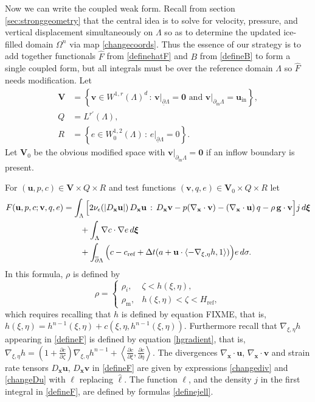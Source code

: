 \documentclass[letterpaper,final,12pt,reqno]{amsart}
\newcommand{\eps}{\epsilon}
\newcommand{\grad}{\nabla}
\newcommand{\bu}{\mathbf{u}}
\newcommand{\bv}{\mathbf{v}}
\newcommand{\bx}{\mathbf{x}}
\newcommand{\bV}{\mathbf{V}}
\newcommand{\bxi}{\bm{\xi}}
\newcommand{\bzero}{\bm{0}}
\newcommand{\cref}{c_{\text{ref}}}
\newcommand{\Href}{H_{\text{ref}}}
\newcommand{\rhom}{\rho_{\text{m}}}
\begin{document}
Now we can write the coupled weak form.  Recall from section \ref{sec:stronggeometry} that the central idea is to solve for velocity, pressure, and vertical displacement simultaneously on $\Lambda$ so as to determine the updated ice-filled domain $\Omega^n$ via map \eqref{changecoords}.  Thus the essence of our strategy is to add together functionals $\hat F$ from \eqref{definehatF} and $B$ from \eqref{defineB} to form a single coupled form, but all integrals must be over the reference domain $\Lambda$ so $\hat F$ needs modification.  Let
\begin{align*}
\bV &= \left\{\bv \in W^{1,r}(\Lambda)^d\,:\,\bv\big|_{\underline{\partial} \Lambda}=\bzero \text{ and } \bv\big|_{\partial_{\text{in}} \Lambda} = \bu_{\text{in}}\right\}, \\
Q   &= L^{r'}(\Lambda), \\
R   &= \left\{e \in W_0^{1,2}(\Lambda)\,:\,e\big|_{\underline{\partial} \Lambda} = 0\right\}.
\end{align*}
Let $\bV_0$ be the obvious modified space with $\bv\big|_{\partial_{\text{in}} \Lambda} = \bzero$ if an inflow boundary is present.

For $(\bu,p,c) \in \bV\times Q\times R$ and test functions $(\bv,q,e) \in \bV_0\times Q\times R$ let
\begin{align}
F(\bu,p,c;\bv,q,e) &= \int_{\Lambda} \Big[2 \nu_\eps(|D_\bx\bu|)\, D_\bx\bu\,:\,D_\bx\bv - p (\nabla_\bx \cdot \bv) - \left(\nabla_\bx \cdot \bu\right) q - \rho\, \mathbf{g} \cdot \bv\Big] j \,d\bxi \notag \\
&\qquad + \int_\Lambda \grad c \cdot \grad e \,d\bxi \notag \\
&\qquad + \int_{\overline{\partial} \Lambda} \Big(c - \cref + \Delta t(a + \bu\cdot \left<-\grad_{\xi,\eta} h,1\right>)\Big) e\,d\sigma. \label{defineF}
\end{align}
In this formula, $\rho$ is defined by
    $$\rho = \begin{cases} \rho_i, & \zeta < h(\xi,\eta), \\
                           \rhom, & h(\xi,\eta) < \zeta < \Href, \end{cases}$$
which requires recalling that $h$ is defined by equation FIXME, that is, $h(\xi,\eta)=h^{n-1}(\xi,\eta) + c(\xi,\eta,h^{n-1}(\xi,\eta))$.  Furthermore recall that $\grad_{\xi,\eta} h$ appearing in \eqref{defineF} is defined by equation \eqref{hgradient}, that is, $\grad_{\xi,\eta} h = \left(1+\frac{\partial c}{\partial\zeta}\right) \grad_{\xi,\eta} h^{n-1} + \left<\frac{\partial c}{\partial\xi},\frac{\partial c}{\partial\eta}\right>$.  The divergences $\grad_\bx \cdot\bu$, $\grad_\bx \cdot\bv$ and strain rate tensors $D_\bx\bu$, $D_\bx\bv$ in \eqref{defineF} are given by expressions \eqref{changediv} and \eqref{changeDu} with $\ell$ replacing $\hat\ell$.  The function $\ell$, and the density $j$ in the first integral in \eqref{defineF}, are defined by formulas \eqref{definejell}.
\end{document}
